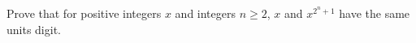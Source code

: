 Prove that for positive integers $x$ and integers $n\ge2$, $x$ and $x^{2^n+1}$ have the same units digit.
